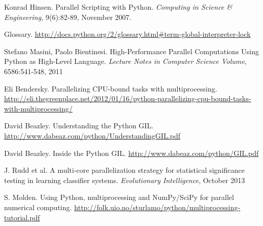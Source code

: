 \documentclass[letterpaper,twocolumn,10pt]{article}
\begin{document}
\begin{thebibliography}{10}

   Konrad Hinsen. Parallel Scripting with Python. {\em 
  Computing in Science \& Engineering}, 9(6):82-89, November 2007.

    Glossary. \url{http://docs.python.org/2/glossary.html#term-global-interpreter-lock}
  
   Stefano Masini, Paolo Bientinesi. High-Performance Parallel Computations Using Python as High-Level Language. {\em Lecture Notes in Computer Science Volume}, 6586:541-548, 2011
  
   Eli Bendersky. Parallelizing CPU-bound tasks with multiprocessing. \url{http://eli.thegreenplace.net/2012/01/16/python-parallelizing-cpu-bound-tasks-with-multiprocessing/}

   David Beazley. Understanding the Python GIL. \url{http://www.dabeaz.com/python/UnderstandingGIL.pdf}

   David Beazley. Inside the Python GIL. \url{http://www.dabeaz.com/python/GIL.pdf}

   J. Rudd et al. A multi-core parallelization strategy for statistical significance testing in learning classifier systems. {\em Evolutionary Intelligence}, October 2013

   S. Molden. Using Python, multiprocessing and NumPy/SciPy for parallel numerical computing. \url{http://folk.uio.no/sturlamo/python/multiprocessing-tutorial.pdf}
 
\end{thebibliography}
\end{document}

